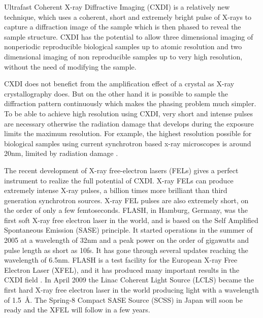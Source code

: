 
Ultrafast Coherent X-ray Diffractive Imaging (CXDI) is a relatively new
technique, which uses a coherent, short and extremely
bright pulse of X-rays to capture a diffraction image of the sample which is
then phased to reveal the sample structure. CXDI has the potential to allow three
dimensional imaging of nonperiodic reproducible biological samples up to atomic
resolution and two dimensional imaging of non reproducible samples up to
very high resolution, without the need of modifying the sample.

CXDI does not benefict from the
amplification effect of a crystal as X-ray crystallography does. But on the
other hand it is possible to sample the diffraction pattern continuously which
makes the phasing problem much simpler. To be able to achieve high 
resolution using CXDI, very short and intense pulses are necessary otherwise the radiation
damage that develops during the exposure limits the maximum resolution. For
example, the highest resolution possible for biological samples using current
synchrotron based x-ray microscopes is around 20nm, limited by radiation
damage \cite{Howells2009Assessment}.

The recent development of X-ray free-electron lasers (FELs) gives a perfect
instrument to realize the full potential of CXDI. X-ray FELs can produce extremely
intense X-ray pulses, a billion times more brilliant than third
generation synchrotron sources. X-ray FEL pulses are also extremely short, on the order of
only a few femtoseconds. FLASH, in Hamburg, Germany, was the first soft X-ray
free electron laser in the world, and is based on the Self Amplified Spontaneous
Emission (SASE) principle. It started operations in the summer of 2005 at
a wavelength of 32nm and a peak power on the order of gigawatts and pulse length as
short as 10fs. It has gone through several updates reaching the wavelength of
6.5nm. FLASH is a test facility for the European X-ray Free Electron
Laser (XFEL), and it has produced many important results in the CXDI field \cite{Chapman2006Femtosecond,Chapman2007Femtosecond}. In April 2009 the Linac Coherent Light Source (LCLS)
became the first hard X-ray free electron laser in the world producing light
with a wavelength of \mbox{1.5 \AA}. The Spring-8 Compact SASE Source (SCSS) in
Japan will soon be ready and the XFEL will follow in a few years.

